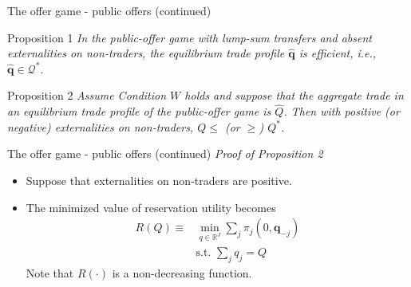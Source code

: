 \documentclass[aspectratio=169]{beamer}  %
\begin{document}
\begin{frame}{The offer game - public offers (continued)}
    \begin{block}{Proposition 1}
        \textit{In the public-offer game with lump-sum transfers and absent externalities on non-traders, the equilibrium trade profile $\hat{\mathbf{q}}$ is efficient, i.e., $\hat{\mathbf{q}}\in \mathcal{Q}^*$.}
    \end{block}\vspace{.2cm}
    \begin{block}{Proposition 2}
        \textit{Assume Condition $W$ holds and suppose that the aggregate trade
        in an equilibrium trade profile of the public-offer game is $\hat{Q}$. Then with positive (or negative) externalities on non-traders, $Q\leq$ (or $\geq$) $Q^*$.}
    \end{block}
\end{frame}



\begin{frame}{The offer game - public offers (continued)}
    \textit{Proof of Proposition 2} \vspace{.2cm}
    \begin{itemize}
        \item Suppose that externalities on non-traders are positive. \vspace{.2cm}
        \item The minimized value of reservation utility becomes \vspace{.2cm}
        \begin{equation*}
            \begin{aligned}
                R(Q) \equiv & \min_{q \in \mathbb{R}^J} \sum_j \pi_j(0, \mathbf{q}_{-j}) \\
                & \text{s.t. } \sum_j q_j = Q
            \end{aligned}
        \end{equation*}
        Note that $R(\cdot)$ is a non-decreasing function. \vspace{.2cm}
    \end{itemize}
\end{frame}
\end{document}
